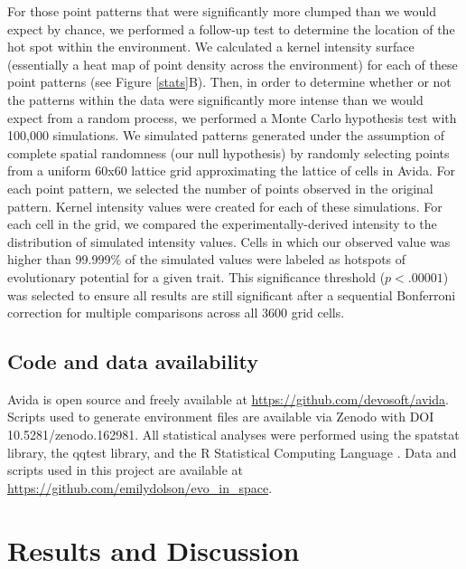 \documentclass[letterpaper]{article}
\begin{document}
For those point patterns that were significantly more clumped than we would expect by chance, we performed a follow-up test to determine the location of the hot spot within the environment. We calculated a kernel intensity surface (essentially a heat map of point density across the environment) for each of these point patterns (see Figure \ref{stats}B). Then, in order to determine whether or not the patterns within the data were significantly more intense than we would expect from a random process, we performed a Monte Carlo hypothesis test with 100,000 simulations. We simulated patterns generated under the assumption of complete spatial randomness (our null hypothesis) by randomly selecting points from a uniform 60x60 lattice grid approximating the lattice of cells in Avida.  For each point pattern, we selected the number of points observed in the original pattern. Kernel intensity values were created for each of these simulations. For each cell in the grid, we compared the experimentally-derived intensity to the distribution of simulated intensity values. Cells in which our observed value was higher than 99.999\% of the simulated values were labeled as hotspots of evolutionary potential for a given trait. This significance threshold ($p < .00001$) was selected to ensure all results are still significant after a sequential Bonferroni correction for multiple comparisons across all 3600 grid cells.

\subsection{Code and data availability}
Avida is open source and freely available at \href{https://github.com/devosoft/avida}{https://github.com/devosoft/avida}. Scripts used to generate environment files are available via Zenodo with DOI 10.5281/zenodo.162981. All statistical analyses were performed using the spatstat library, the qqtest library, and the R Statistical Computing Language \citep{baddeley_spatial_2015,oldford_qqtest:_2016, team_r:_2013}. Data and scripts used in this project are available at \href{https://github.com/emilydolson/evo_in_space}{https://github.com/emilydolson/evo\_in\_space}.

\section{Results and Discussion}
\end{document}

